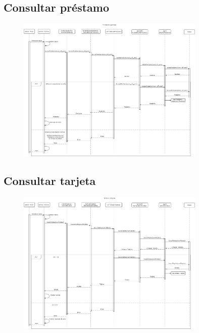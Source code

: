 \documentclass[12pt]{article}
\begin{document}
\subsection{Consultar préstamo}
\begin{figure}[H]
    \centering
    \includegraphics[width=0.8\textwidth]{images/consultar_prestamo.png}
\end{figure}
\subsection{Consultar tarjeta}
\begin{figure}[H]
    \centering
    \includegraphics[width=0.8\textwidth]{images/consultarTarjeta.png}
\end{figure}
\end{document}
